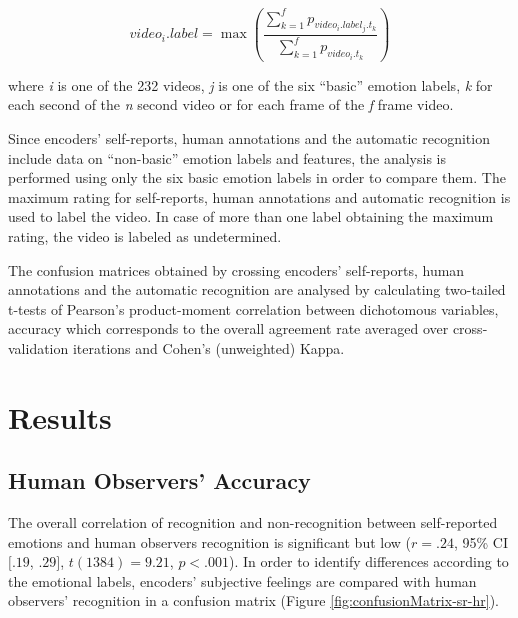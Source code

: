 \documentclass[
  english,
  doc]{apa7}
\begin{document}
\begin{equation}
video_{i}.label = \max\left(\frac{\sum_{k=1}^{f}p_{video_{i}.label_{j}.t_{k}}}{\sum_{k=1}^{f}p_{video_{i}.t_{k}}}\right)\label{eq:three}
\end{equation}

where \emph{i} is one of the 232 videos, \emph{j} is one of the six ``basic'' emotion labels, \emph{k} for each second of the \emph{n} second video or for each frame of the \emph{f} frame video.

Since encoders' self-reports, human annotations and the automatic recognition include data on ``non-basic'' emotion labels and features, the analysis is performed using only the six basic emotion labels in order to compare them. The maximum rating for self-reports, human annotations and automatic recognition is used to label the video. In case of more than one label obtaining the maximum rating, the video is labeled as undetermined.

The confusion matrices obtained by crossing encoders' self-reports, human annotations and the automatic recognition are analysed by calculating two-tailed t-tests of Pearson's product-moment correlation between dichotomous variables, accuracy which corresponds to the overall agreement rate averaged over cross-validation iterations and Cohen's (unweighted) Kappa.

\hypertarget{results}{%
\section{Results}\label{results}}

\hypertarget{human-observers-accuracy}{%
\subsection{Human Observers' Accuracy}\label{human-observers-accuracy}}

The overall correlation of recognition and non-recognition between self-reported emotions and human observers recognition is significant but low (\(r = .24\), 95\% CI \([.19\), \(.29]\), \(t(1384) = 9.21\), \(p < .001\)). In order to identify differences according to the emotional labels, encoders' subjective feelings are compared with human observers' recognition in a confusion matrix (Figure \ref{fig:confusionMatrix-sr-hr}).
\end{document}
